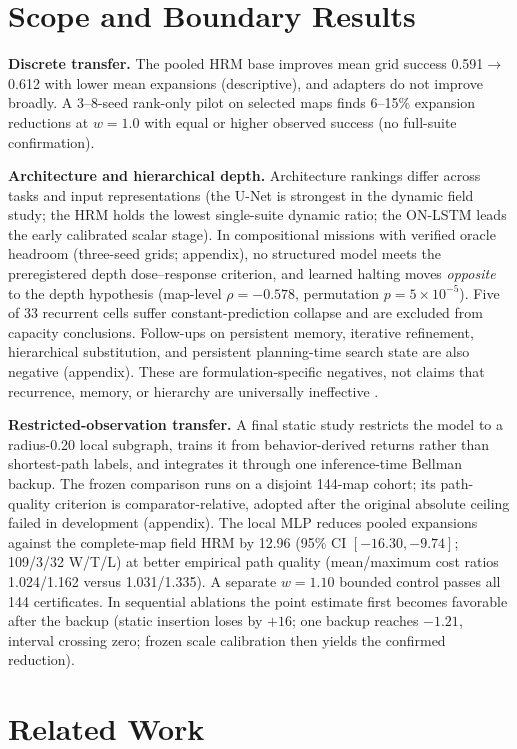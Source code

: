 \documentclass[letterpaper]{article} %
\begin{document}
\section{Scope and Boundary Results}

\textbf{Discrete transfer.} The pooled HRM base improves mean grid success 0.591$\to$0.612 with lower mean expansions (descriptive), and adapters do not improve broadly. A 3--8-seed rank-only pilot on selected maps finds 6--15\% expansion reductions at $w{=}1.0$ with equal or higher observed success (no full-suite confirmation).

\textbf{Architecture and hierarchical depth.} Architecture rankings differ across tasks and input representations (the U-Net is strongest in the dynamic field study; the HRM holds the lowest single-suite dynamic ratio; the ON-LSTM leads the early calibrated scalar stage). In compositional missions with verified oracle headroom (three-seed grids; appendix), no structured model meets the preregistered depth dose--response criterion, and learned halting moves \emph{opposite} to the depth hypothesis (map-level $\rho{=}-0.578$, permutation $p{=}5\times10^{-5}$). Five of 33 recurrent cells suffer constant-prediction collapse and are excluded from capacity conclusions. Follow-ups on persistent memory, iterative refinement, hierarchical substitution, and persistent planning-time search state are also negative (appendix). These are formulation-specific negatives, not claims that recurrence, memory, or hierarchy are universally ineffective \citep{jolicoeur2025trm,czechowski2021subgoal}.

\textbf{Restricted-observation transfer.} A final static study restricts the model to a radius-0.20 local subgraph, trains it from behavior-derived returns rather than shortest-path labels, and integrates it through one inference-time Bellman backup. The frozen comparison runs on a disjoint 144-map cohort; its path-quality criterion is comparator-relative, adopted after the original absolute ceiling failed in development (appendix). The local MLP reduces pooled expansions against the complete-map field HRM by 12.96 (95\% CI $[-16.30,-9.74]$; 109/3/32 W/T/L) at better empirical path quality (mean/maximum cost ratios 1.024/1.162 versus 1.031/1.335). A separate $w{=}1.10$ bounded control passes all 144 certificates. In sequential ablations the point estimate first becomes favorable after the backup (static insertion loses by $+16$; one backup reaches $-1.21$, interval crossing zero; frozen scale calibration then yields the confirmed reduction).
\section{Related Work}
\end{document}
